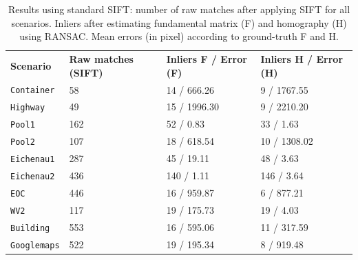 \begin{table}[t]
  \begin{center}
  \small 
  \begin{tabular}{@{}p{.15\linewidth}p{.13\linewidth}p{.12\linewidth}p{.12\linewidth}@{}}
    \toprule
    {\textbf{Scenario}} & {\textbf{Raw matches (SIFT)}} & {\textbf{Inliers F / Error (F)}} & {\textbf{Inliers H / Error (H)}} \\
    \cmidrule(){1-4}
  \texttt{Container}  &  58 &  14 /  666.26 &   9 / 1767.55 \\ %
  \texttt{Highway}    &  49 &  15 / 1996.30 &   9 / 2210.20 \\ %
  \texttt{Pool1}      & 162 &  52 /    0.83 &  33 /    1.63 \\ %
  \texttt{Pool2}      & 107 &  18 /  618.54 &  10 / 1308.02 \\ %
  \texttt{Eichenau1}  & 287 &  45 /   19.11 &  48 /    3.63 \\ %
  \texttt{Eichenau2}  & 436 & 140 /    1.11 & 146 /    3.64 \\ %
  \texttt{EOC}        & 446 &  16 /  959.87 &   6 /  877.21 \\ %
  \texttt{WV2}        & 117 &  19 /  175.73 &  19 /    4.03 \\ %
  \texttt{Building}   & 553 &  16 /  595.06 &  11 /  317.59 \\ %
  \texttt{Googlemaps} & 522 &  19 /  195.34 &   8 /  919.48 \\
  \bottomrule
  \end{tabular}
  \end{center}
  \caption {Results using standard SIFT: number of raw matches after applying SIFT for all scenarios. Inliers after estimating fundamental matrix (F) and homography (H) using RANSAC. Mean errors (in pixel) according to ground-truth F and H.}
\label{tab:Result_sift}
\end{table}

